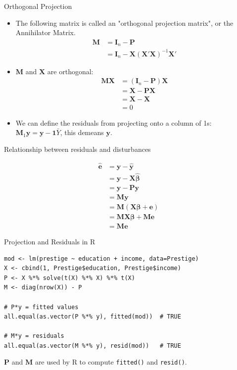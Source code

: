 \documentclass[aspectratio=169, handout]{beamer}
\numberwithin{equation}{section}
\begin{document}
\begin{frame}{Orthogonal Projection}
\begin{itemize}
\item The following matrix is called an "orthogonal projection matrix", or the Annihilator Matrix.
\begin{align*}
\bm{M}&=\bm{I}_n-\bm{P}\\
&=\bm{I}_n-\bm{X}(\bm{X}'\bm{X})^{-1}\bm{X}'
\end{align*}
\item $\bm{M}$ and $\bm{X}$ are orthogonal:
\begin{align*}
\bm{MX}&=(\bm{I}_n-\bm{P})\bm{X}\\
&=\bm{X}-\bm{P}\bm{X}\\
&=\bm{X}-\bm{X}\\
&=0
\end{align*}
\item We can define the residuals from projecting onto a column of 1s: $\bm{M}_1\bm{y}=\bm{y}-\bm{1}\bar{Y}$, this demeans $\bm{y}$.

\end{itemize}
\end{frame}

\begin{frame}{Relationship between residuals and disturbances}

\begin{align*}
\bm{\hat{e}}&=\bm{y}-\bm{\hat{y}}\\
&=\bm{y}-\bm{X\hat{\beta}}\\
&=\bm{y}-\bm{Py}\\
&=\bm{My}\\
&=\bm{M}(\bm{X\beta}+\bm{e})\\
&=\bm{M}\bm{X\beta}+\bm{M}\bm{e}\\
&=\bm{M}\bm{e}
\end{align*}

\end{frame}

\begin{frame}[fragile]{Projection and Residuals in R}
\begin{lstlisting}
mod <- lm(prestige ~ education + income, data=Prestige)
X <- cbind(1, Prestige$education, Prestige$income)
P <- X %*% solve(t(X) %*% X) %*% t(X)
M <- diag(nrow(X)) - P

# P*y = fitted values
all.equal(as.vector(P %*% y), fitted(mod))  # TRUE

# M*y = residuals
all.equal(as.vector(M %*% y), resid(mod))   # TRUE
\end{lstlisting}
\vspace{1ex}
$\bm{P}$ and $\bm{M}$ are used by R to compute \texttt{fitted()} and \texttt{resid()}.
\end{frame}
\end{document}
